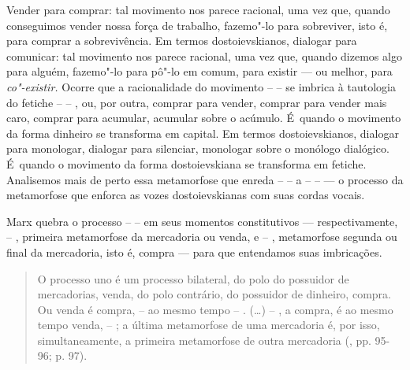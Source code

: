 Vender para comprar: tal movimento nos parece racional, uma vez que,
quando conseguimos vender nossa força de trabalho, fazemo"-lo para
sobreviver, isto é, para comprar a sobrevivência. Em termos
dostoievskianos, dialogar para comunicar: tal movimento nos parece
racional, uma vez que, quando dizemos algo para alguém, fazemo"-lo para
pô"-lo em comum, para existir --- ou melhor, para \emph{co"-existir.}
Ocorre que a racionalidade do movimento  --  --  se imbrica à
tautologia do fetiche  --  -- , ou, por outra, comprar para vender,
comprar para vender mais caro, comprar para acumular, acumular sobre o
acúmulo. É~quando o movimento da forma dinheiro se transforma em
capital. Em termos dostoievskianos, dialogar para monologar, dialogar
para silenciar, monologar sobre o monólogo dialógico. É~quando o
movimento da forma dostoievskiana se transforma em fetiche. Analisemos
mais de perto essa metamorfose que enreda  --  --  a  --  --  --- o
processo da metamorfose que enforca as vozes dostoievskianas com suas
cordas vocais.

Marx quebra o processo  --  --  em seus momentos constitutivos ---
respectivamente,  -- , primeira metamorfose da mercadoria ou venda, e
 -- , metamorfose segunda ou final da mercadoria, isto é, compra ---
para que entendamos suas imbricações.

\begin{quote}
O processo uno é um processo bilateral, do polo do possuidor de
mercadorias, venda, do polo contrário, do possuidor de dinheiro, compra.
Ou venda é compra,  --  ao mesmo tempo  -- . (\ldots)  -- , a compra,
é ao mesmo tempo venda,  -- ; a última metamorfose de uma mercadoria
é, por isso, simultaneamente, a primeira metamorfose de outra mercadoria
(, pp. 95-96; p. 97).
\end{quote}

